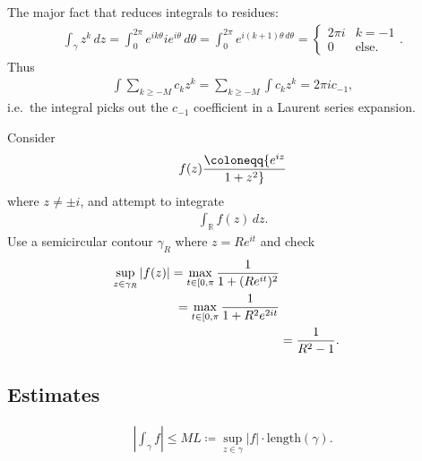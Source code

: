 \begin{fact}

The major fact that reduces integrals to residues:
\begin{align*}
\int_\gamma z^k \,dz= \int_0^{2\pi} e^{ik\theta} ie^{i\theta } \,d\theta= \int_0^{2\pi} e^{i(k+1)\theta \,d\theta}
=
\begin{cases}
2\pi i & k=-1 
\\
0 & \text{else}.
\end{cases}
.\end{align*}
Thus
\begin{align*}
\int \sum_{k\geq -M} c_k z^k = \sum_{k\geq -M} \int c_k z^k = 2\pi i c_{-1}
,\end{align*}
i.e.~the integral picks out the \(c_{-1}\) coefficient in a Laurent
series expansion.

\end{fact}

\begin{example}[?]

Consider
\begin{align*}
f(z) \coloneqq{e^{iz} \over 1 + z^2}
\end{align*}
where \(z\neq \pm i\), and attempt to integrate
\begin{align*}
\int_{\mathbb{R}}f(z) \,dz
.\end{align*}
Use a semicircular contour \(\gamma_R\) where \(z = Re^{it}\) and check
\begin{align*}
\sup_{z\in \gamma_R} {\left\lvert {f(z)} \right\rvert} 
= \max_{t\in [0, \pi} {1 \over 1 + (Re^{it})^2 } \\
= \max_{t\in [0, \pi} {1 \over 1 + R^2e^{2it} } \\
&= {1\over R^2 - 1}
.\end{align*}

\end{example}

\hypertarget{estimates}{%
\subsection{Estimates}\label{estimates}}

\begin{proposition}

\begin{align*}
{\left\lvert { \int_\gamma f} \right\rvert} \leq ML \coloneqq\sup_{z\in \gamma} {\left\lvert {f} \right\rvert} \cdot \mathrm{length}(\gamma)
.\end{align*}

\end{proposition}

